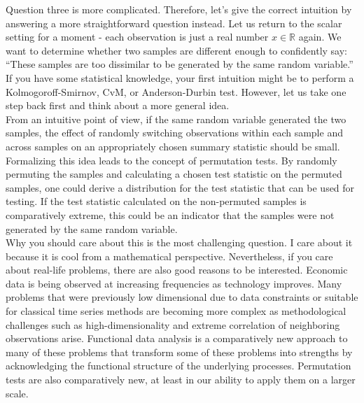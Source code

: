 \documentclass[12pt, a4paper]{article}
\theoremstyle{MAstyle} \newtheorem{assumption}{Assumption}[section]
\theoremstyle{MAstyle} \newtheorem{definition}{Definition}[section]
\theoremstyle{MAstyle} \newtheorem{theorem}{Theorem}[section]
\begin{document}
			Question three is more complicated. Therefore, let's give the correct intuition by answering a more straightforward question instead. Let us return to the scalar setting for a moment - each observation is just a real number $x \in \mathbb{R}$ again. We want to determine whether two samples are different enough to confidently say: ``These samples are too dissimilar to be generated by the same random variable.'' If you have some statistical knowledge, your first intuition might be to perform a Kolmogoroff-Smirnov, CvM, or Anderson-Durbin test. However, let us take one step back first and think about a more general idea.\\
			
			From an intuitive point of view, if the same random variable generated the two samples, the effect of randomly switching observations within each sample and across samples on an appropriately chosen summary statistic should be small. Formalizing this idea leads to the concept of permutation tests. By randomly permuting the samples and calculating a chosen test statistic on the permuted samples, one could derive a distribution for the test statistic that can be used for testing. If the test statistic calculated on the non-permuted samples is comparatively extreme, this could be an indicator that the samples were not generated by the same random variable.\\
			
			Why you should care about this is the most challenging question. I care about it because it is cool from a mathematical perspective. Nevertheless, if you care about real-life problems, there are also good reasons to be interested. Economic data is being observed at increasing frequencies as technology improves. Many problems that were previously low dimensional due to data constraints or suitable for classical time series methods are becoming more complex as methodological challenges such as high-dimensionality and extreme correlation of neighboring observations arise. Functional data analysis is a comparatively new approach to many of these problems that transform some of these problems into strengths by acknowledging the functional structure of the underlying processes. Permutation tests are also comparatively new, at least in our ability to apply them on a larger scale.
			
\end{document}

